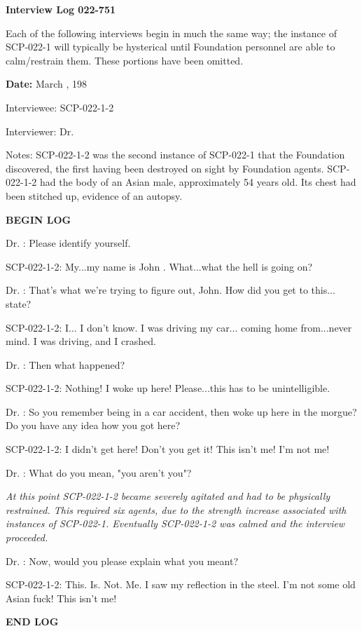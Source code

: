 \textbf{Interview Log 022-751}

Each of the following interviews begin in much the same way; the instance of SCP-022-1 will typically be hysterical until Foundation personnel are able to calm/restrain them. These portions have been omitted.

\textbf{Date:} March , 198

Interviewee: SCP-022-1-2

Interviewer: Dr. 

Notes: SCP-022-1-2 was the second instance of SCP-022-1 that the Foundation discovered, the first having been destroyed on sight by Foundation agents. SCP-022-1-2 had the body of an Asian male, approximately 54 years old. Its chest had been stitched up, evidence of an autopsy.

\begin{leftbar}
\begin{flushleft}
\textbf{\lb BEGIN LOG\rb}

Dr. : Please identify yourself.

SCP-022-1-2: My...my name is John . What...what the hell is going on?

Dr. : That's what we're trying to figure out, John. How did you get to this... state?

SCP-022-1-2: I... I don't know. I was driving my car... coming home from...never mind. I was driving, and I crashed.

Dr. : Then what happened?

SCP-022-1-2: Nothing! I woke up here! Please...this has to be \lb unintelligible\rb.

Dr. : So you remember being in a car accident, then woke up here in the morgue? Do you have any idea how you got here?

SCP-022-1-2: I didn't get here! Don't you get it! This isn't me! I'm not me!

Dr. : What do you mean, "you aren't you"?

\textsl{At this point SCP-022-1-2 became severely agitated and had to be physically restrained. This required six agents, due to the strength increase associated with instances of SCP-022-1. Eventually SCP-022-1-2 was calmed and the interview proceeded.}

Dr. : Now, would you please explain what you meant?

SCP-022-1-2: This. Is. Not. Me. I saw my reflection in the steel. I'm not some old Asian fuck! This isn't me!

\textbf{\lb END LOG\rb}
\end{flushleft}
\end{leftbar}

